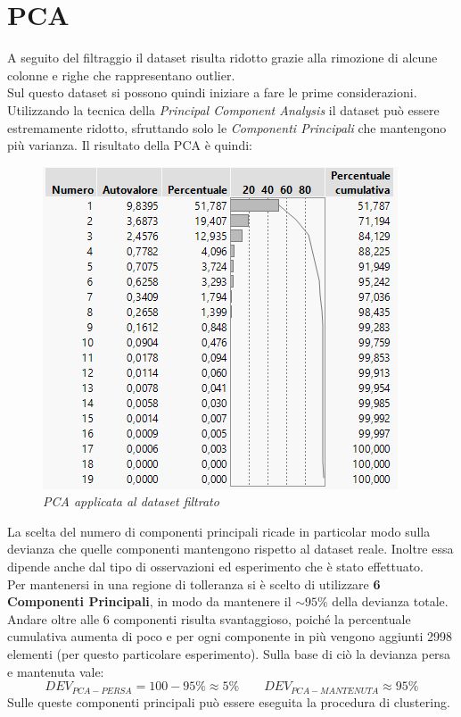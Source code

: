 \section{PCA}
A seguito del filtraggio il dataset risulta ridotto grazie alla rimozione di alcune colonne e righe che rappresentano outlier.
\\Sul questo dataset si possono quindi iniziare a fare le prime considerazioni.
\\Utilizzando la tecnica della \textit{Principal Component Analysis} il dataset può essere estremamente ridotto, sfruttando solo le \textit{Componenti Principali} che mantengono più varianza. Il risultato della PCA è quindi:
\begin{figure}[H]
	\centering
	\includegraphics{img/hw1/pca.png}
	\caption{\textit{PCA applicata al dataset filtrato}}
\end{figure}
La scelta del numero di componenti principali ricade in particolar modo sulla devianza che quelle componenti mantengono rispetto al dataset reale. Inoltre essa dipende anche dal tipo di osservazioni ed esperimento che è stato effettuato.
\\Per mantenersi in una regione di tolleranza si è scelto di utilizzare \textbf{6 Componenti Principali}, in modo da mantenere il $\sim95\%$ della devianza totale. Andare oltre alle 6 componenti risulta svantaggioso, poiché la percentuale cumulativa aumenta di poco e per ogni componente in più vengono aggiunti 2998 elementi (per questo particolare esperimento). Sulla base di ciò la devianza persa e mantenuta vale:
\begin{equation*}
	DEV_{PCA-PERSA} = 100-95 \% \approx 5\% \qquad 	DEV_{PCA-MANTENUTA} \approx 95 \%
\end{equation*}
Sulle queste componenti principali può essere eseguita la procedura di clustering.

